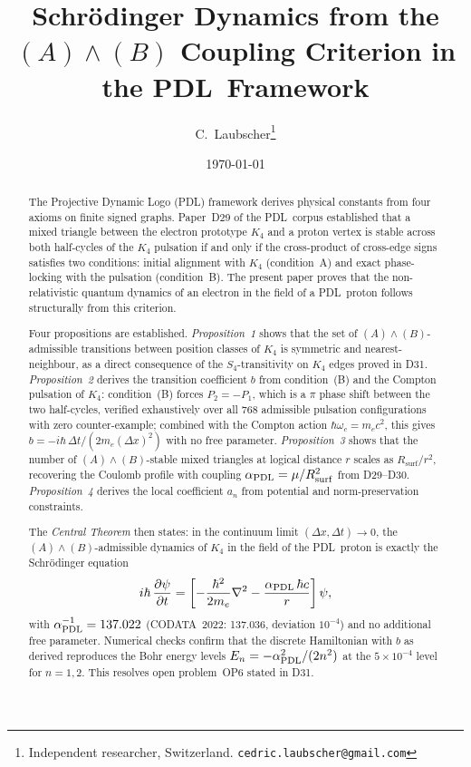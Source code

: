 \documentclass[11pt,a4paper]{article}
\theoremstyle{definition}
\newcommand{\PDL}{\textnormal{PDL}}
\newcommand{\Rsurf}{R_{\mathrm{surf}}}
\newcommand{\hb}{\hbar}
\newcommand{\aPDL}{\alpha_{\PDL}}
\begin{document}
\title{Schr\"odinger Dynamics from the $(A)\wedge(B)$ Coupling Criterion in the \PDL\ Framework}
\author{C.~Laubscher\thanks{Independent researcher, Switzerland. \texttt{cedric.laubscher@gmail.com}}}
\date{\small \today}
\maketitle

\begin{abstract}
The Projective Dynamic Logo (\PDL) framework derives physical constants from four axioms on finite signed graphs. Paper~D29 of the \PDL\ corpus established that a mixed triangle between the electron prototype $K_4$ and a proton vertex is stable across both half-cycles of the $K_4$ pulsation if and only if the cross-product of cross-edge signs satisfies two conditions: initial alignment with $K_4$ (condition~A) and exact phase-locking with the pulsation (condition~B). The present paper proves that the non-relativistic quantum dynamics of an electron in the field of a \PDL\ proton follows structurally from this criterion.

Four propositions are established. \emph{Proposition~1} shows that the set of $(A)\wedge(B)$-admissible transitions between position classes of $K_4$ is symmetric and nearest-neighbour, as a direct consequence of the $S_4$-transitivity on $K_4$ edges proved in D31. \emph{Proposition~2} derives the transition coefficient $b$ from condition~(B) and the Compton pulsation of $K_4$: condition~(B) forces $P_2 = -P_1$, which is a $\pi$ phase shift between the two half-cycles, verified exhaustively over all 768 admissible pulsation configurations with zero counter-example; combined with the Compton action $\hb\omega_c = m_e c^2$, this gives $b = -i\hb\,\Delta t/(2m_e(\Delta x)^2)$ with no free parameter. \emph{Proposition~3} shows that the number of $(A)\wedge(B)$-stable mixed triangles at logical distance $r$ scales as $\Rsurf/r^2$, recovering the Coulomb profile with coupling $\aPDL = \mu/\Rsurf^2$ from D29--D30. \emph{Proposition~4} derives the local coefficient $a_n$ from potential and norm-preservation constraints.

The \emph{Central Theorem} then states: in the continuum limit $(\Delta x,\Delta t)\to 0$, the $(A)\wedge(B)$-admissible dynamics of $K_4$ in the field of the \PDL\ proton is exactly the Schr\"odinger equation
\[
i\hb\,\frac{\partial\psi}{\partial t} = \left[-\frac{\hb^2}{2m_e}\nabla^2 - \frac{\aPDL\,\hb c}{r}\right]\psi,
\]
with $\aPDL^{-1} = 137.022$ (CODATA~2022: 137.036, deviation $10^{-4}$) and no additional free parameter. Numerical checks confirm that the discrete Hamiltonian with $b$ as derived reproduces the Bohr energy levels $E_n = -\aPDL^2/(2n^2)$ at the $5\times10^{-4}$ level for $n=1,2$. This resolves open problem~OP6 stated in D31.
\end{abstract}
\end{document}
